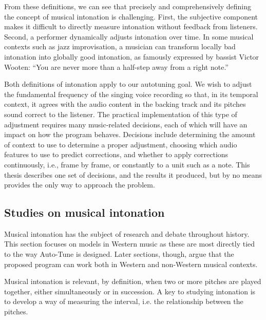 From these definitions, we can see that precisely and comprehensively defining the concept of musical intonation is challenging. First, the subjective component makes it difficult to directly measure intonation without feedback from listeners. Second, a performer dynamically adjusts intonation over time. In some musical contexts such as jazz improvisation, a musician can transform locally bad intonation into globally good intonation, as famously expressed by bassist Victor Wooten: ``You are never more than a half-step away from a right note.''

Both definitions of intonation apply to our autotuning goal. We wish to adjust the fundamental frequency of the singing voice recording so that, in its temporal context, it agrees with the audio content in the backing track and its pitches sound correct to the listener. The practical implementation of this type of adjustment requires many music-related decisions, each of which will have an impact on how the program behaves. Decisions include determining the amount of context to use to determine a proper adjustment, choosing which audio features to use to predict corrections, and whether to apply corrections continuously, i.e., frame by frame, or constantly to a unit such as a note. This thesis describes one set of decisions, and the results it produced, but by no means provides the only way to approach the problem.

\subsection{Studies on musical intonation}
Musical intonation has the subject of research and debate throughout history. This section focuses on models in Western music as these are most directly tied to the way Auto-Tune is designed. Later sections, though, argue that the proposed program can work both in Western and non-Western musical contexts. 

Musical intonation is relevant, by definition, when two or more pitches are played together, either simultaneously or in succession. A key to studying intonation is to develop a way of measuring the interval, i.e. the relationship between the pitches. 

